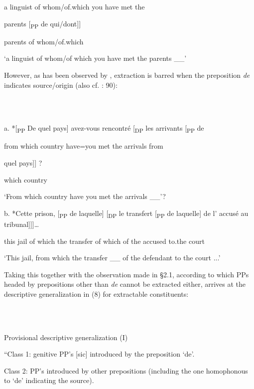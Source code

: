 \documentclass[output=paper]{langsci/langscibook}
\begin{document}
    a  linguist  of whom/of.which  you  have  met     the 

    parents [\textsubscript{PP} de qui/dont]]

    parents  of whom/of.which      

    ‘a linguist of whom/of which you have met the parents \_\_’  \citep[90]{Tellier1991}

However, as has been observed by \citet[225]{Sportiche1981}, extraction is barred when the preposition \textit{de} indicates source/origin (also cf. \citealt{Tellier1991}: 90):

\ea%
    \label{ex:key:7}
    \gll\\
        \\
    \glt
    \z

          a.  *[\textsubscript{PP}  De  quel  pays]    avez-vous  rencontré [\textsubscript{DP} les arrivants  [\textsubscript{PP} de 

        from  which  country  have=you  met      the arrivals  from 

    quel  pays]] ?

    which  country

    ‘From which country have you met the arrivals \_\_’?

b.    *Cette  prison, [\textsubscript{PP}  de laquelle] [\textsubscript{DP}  le transfert [\textsubscript{PP} de  laquelle]  de      l’  accusé    au   tribunal]]]…

this  jail    of which    the transfer  of  which    of  the   accused   to.the  court

‘This jail, from which the transfer \_\_ of the defendant to the court ...’ \citep[225]{Sportiche1981}

Taking this together with the observation made in §2.1, according to which PPs headed by prepositions other than \textit{de} cannot be extracted either, \citet{Sportiche1981} arrives at the descriptive generalization in (8) for extractable constituents:

\ea%
    \label{ex:key:8}
    \gll\\
        \\
    \glt
    \z

          Provisional descriptive generalization (I)

“Class 1: genitive PP’s [sic] introduced by the preposition ‘de’.

Class 2: PP’s introduced by other prepositions (including the one homophonous to ‘de’ indicating the source).
\end{document}
